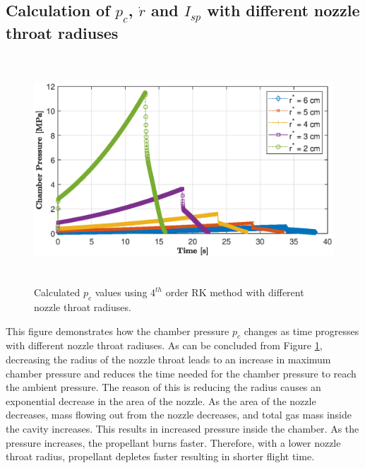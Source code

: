 \documentclass[letterpaper,12pt]{article}
\begin{document}
\subsection{Calculation of $p_c$, $\dot{r}$ and $I_{sp}$ with different nozzle throat radiuses}
\begin{figure}[!h]
	\centering
	\includegraphics[height = 8.5cm]{graphs/q2_pc.eps}
	\caption{Calculated $p_c$ values using $4^{th}$ order RK method with different nozzle throat radiuses.}
	\label{fig:q2p_cp}
\end{figure}

This figure demonstrates how the chamber pressure $p_c$ changes as time progresses with different nozzle throat radiuses.
As can be concluded from Figure \ref{fig:q2p_cp}, decreasing the radius of the nozzle throat leads to an increase in maximum chamber pressure
and reduces the time needed for the chamber pressure to reach the ambient pressure. 
The reason of this is reducing the radius causes an exponential decrease in the area of the nozzle.
As the area of the nozzle decreases, mass flowing out from the nozzle decreases, and total gas mass inside the cavity increases. 
This results in increased pressure inside the chamber. As the pressure increases, the propellant burns faster. 
Therefore, with a lower nozzle throat radius, propellant depletes faster resulting in shorter flight time.
\end{document}
